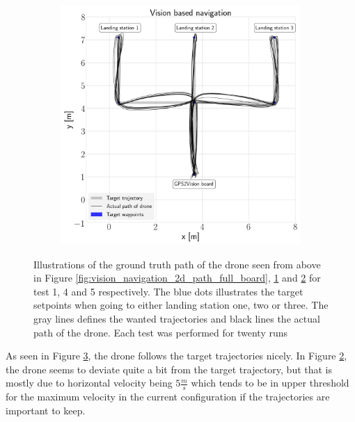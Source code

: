 \documentclass[../Head/report.tex]{subfiles}
\begin{document}
\begin{figure}[H]
\begin{subfigure}[t]{.30\textwidth}
        \caption{}
        \label{fig:vision_navigation_2d_path_missing_markers_wear_vel_1.0}
    \end{subfigure}
     \hspace{0.2em}
    \begin{subfigure}[t]{.30\textwidth}
        \centering
        \includegraphics[width=\textwidth]{../Figures/vision_navigation/test5_one_pattern_missing_markers_wear_board/2d_path.png}
        \caption{}
        \label{fig:vision_navigation_2d_path_missing_markers_wear_vel_5.0}
    \end{subfigure}
    \caption{Illustrations of the ground truth path of the drone seen from above in Figure \ref{fig:vision_navigation_2d_path_full_board}, \ref{fig:vision_navigation_2d_path_missing_markers_wear_vel_1.0} and \ref{fig:vision_navigation_2d_path_missing_markers_wear_vel_5.0} for test 1, 4 and 5 respectively. The blue dots illustrates the target setpoints when going to either landing station one, two or three. The gray lines defines the wanted trajectories and black lines the actual path of the drone. Each test was performed for twenty runs}
    \label{fig:vision_navigation_2d_path}
\end{figure}

As seen in Figure \ref{fig:vision_navigation_2d_path}, the drone follows the target trajectories nicely. In Figure \ref{fig:vision_navigation_2d_path_missing_markers_wear_vel_5.0}, the drone seems to deviate quite a bit from the target trajectory, but that is mostly due to horizontal velocity being $5 \frac{m}{s}$ which tends to be in upper threshold for the maximum velocity in the current configuration if the trajectories are important to keep. 
\end{document}
